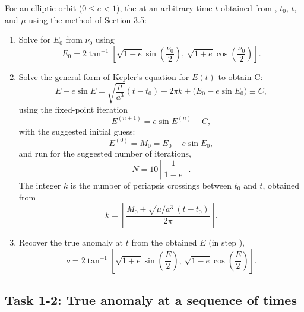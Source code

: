 For an elliptic orbit ($0 \le e < 1$), the  at an arbitrary time $t$  obtained from , $t_0$, $t$, and $\mu$ using the method of Section 3.5:
\begin{enumerate}
    \item Solve for $E_0$ from $\nu_0$ using
    \begin{equation}
        E_0 = 2\tan^{-1}\!\left[\sqrt{1-e}\sin\!\left(\frac{\nu_0}{2}\right),\ \sqrt{1+e}\cos\!\left(\frac{\nu_0}{2}\right)\right].
        \label{eq:t1-E0}
    \end{equation}
    \item Solve the general form of Kepler's equation for $E(t)$ to obtain C:
    \begin{equation}
        E - e\sin E = \sqrt{\frac{\mu}{a^3}}(t-t_0) - 2\pi k + \big(E_0 - e\sin E_0\big) \equiv C,
        \label{eq:t1-kepler}
    \end{equation}
    using the fixed-point iteration
    \begin{equation}
        E^{(n+1)} = e\sin E^{(n)} + C,
        \label{eq:t1-fpi}
    \end{equation}
    with the suggested initial guess:
    \begin{equation}
        E^{(0)} = M_0 = E_0 - e\sin E_0,
    \end{equation}
    and run for the suggested number of iterations,
    \begin{equation}
        N = 10\left\lceil \frac{1}{1-e} \right\rceil.
    \end{equation}
    The integer $k$ is the number of periapsis crossings between $t_0$ and $t$, obtained from
    \begin{equation}
        k = \left\lfloor \frac{M_0 + \sqrt{\mu/a^3}\,(t-t_0)}{2\pi} \right\rfloor.
        \label{eq:t1-k}
    \end{equation}
    \item Recover the true anomaly at $t$ from the obtained $E$ (in step ),
    \begin{equation}
        \nu = 2\tan^{-1}\!\left[\sqrt{1+e}\sin\!\left(\frac{E}{2}\right),\ \sqrt{1-e}\cos\!\left(\frac{E}{2}\right)\right].
        \label{eq:t1-nu}
    \end{equation}
\end{enumerate}

\subsection*{Task 1-2: True anomaly at a sequence of times}

